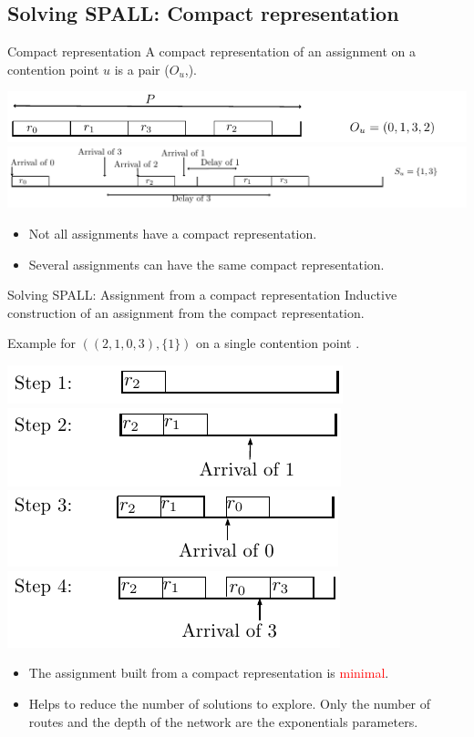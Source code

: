 \documentclass[10 pt]{beamer}
\begin{document}
\subsection{Solving SPALL: Compact representation}
\begin{frame}{Compact representation}
A compact representation of an assignment on a contention point $u$ is a pair ($O_u$,).

	\includegraphics[width=0.65\linewidth]{order}
  \pause
  \includegraphics[width=\linewidth]{subset}


\pause
\begin{itemize}
  \item Not all assignments have a compact representation.
  \pause
  \item Several assignments can have the same compact representation.
  \end{itemize}
\end{frame}
\begin{frame}{Solving SPALL: Assignment from a compact representation }
Inductive construction of an assignment from the compact representation. 

Example for $((2,1,0,3),\{1\})$ on a single contention point .


	\includegraphics[width=0.5\linewidth]{compacttoassignment1}
\pause
\includegraphics[width=0.5\linewidth]{compacttoassignment2}
\pause
\includegraphics[width=0.5\linewidth]{compacttoassignment3}
\pause
\includegraphics[width=0.5\linewidth]{compacttoassignment4}
\pause

\begin{itemize}
  \item The assignment built from a compact representation is \textcolor{red}{minimal}.
  \pause

  \item Helps to reduce the number of solutions to explore. Only the number of routes and the depth of the network are the exponentials parameters.
  \end{itemize}
\end{frame}
\end{document}
